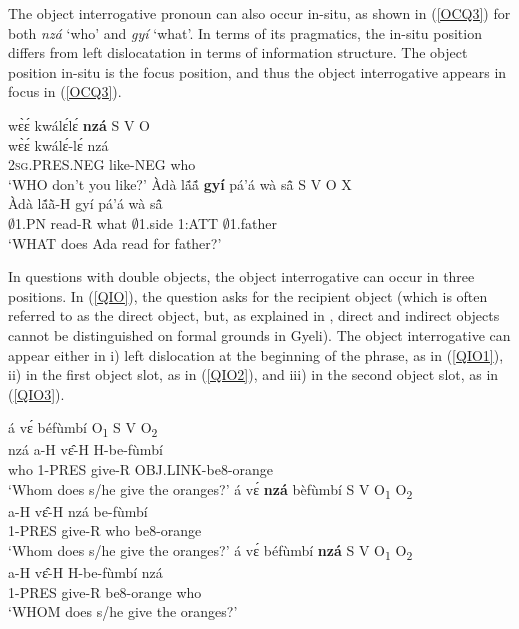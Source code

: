 The object interrogative pronoun can also occur in-situ, as shown in (\ref{OCQ3}) for both {\itshape nzá} `who' and {\itshape gyí} `what'.  In terms of its pragmatics, the in-situ position differs from left dislocatation in terms of information structure. The object position in-situ is the focus position, and thus the object interrogative appears in focus in (\ref{OCQ3}).

\begin{exe}
\ex\label{OCQ3}
\begin{xlist}
\ex \label{OCQ3a}
  \glll      wɛ̀ɛ́ kwálɛ́lɛ́ {\bfseries nzá} \hfill S V O \\
              wɛ̀ɛ́ kwálɛ́-lɛ́ nzá \\
                2\textsc{sg}.PRES.NEG like-NEG who \\
    \trans `WHO don't you like?'
\ex\label{OCQ3b}
 \glll     Àdà lã́ã́ {\bfseries gyí} pá'á wà sã̂  \hfill S V O X \\
            Àdà lã́ã̀-H gyí pá'á wà sã̂ \\
              $\emptyset$1.PN read-R what $\emptyset$1.side 1:ATT $\emptyset$1.father \\
    \trans `WHAT does Ada read for father?'
\end {xlist}
\end {exe}



In questions with double objects, the object interrogative can occur in three positions. In (\ref{QIO}), the question asks for the recipient object (which is often referred to as the direct object, but, as explained in , direct and indirect objects cannot be distinguished on formal grounds in Gyeli). The object interrogative can appear either in i) left dislocation at the beginning of the phrase, as in (\ref{QIO1}), ii) in the first object slot, as in (\ref{QIO2}), and iii) in the second object slot, as in (\ref{QIO3}).

\begin{exe}
\ex\label{QIO} 
\begin{xlist}
\ex \label{QIO1}
   á vɛ́ béfùmbí \hfill O\textsubscript{1} S V O\textsubscript{2}  \\
         nzá a-H vɛ̂-H H-be-fùmbí \\
         who 1-PRES give-R OBJ.LINK-be8-orange  \\
    \trans `Whom does s/he give the oranges?'
\ex\label{QIO2}
  \glll á vɛ́ {\bfseries nzá} bèfùmbí  \hfill S V O\textsubscript{1} O\textsubscript{2} \\
       a-H vɛ̂-H nzá be-fùmbí \\
           1-PRES give-R who be8-orange  \\
    \trans `Whom does s/he give the oranges?'
\ex\label{QIO3}
  \glll  á vɛ́ béfùmbí {\bfseries nzá} \hfill S V O\textsubscript{1} O\textsubscript{2} \\
          a-H vɛ̂-H H-be-fùmbí nzá \\
           1-PRES give-R be8-orange who  \\
    \trans `WHOM does s/he give the oranges?'
\end{xlist}
\end{exe}

